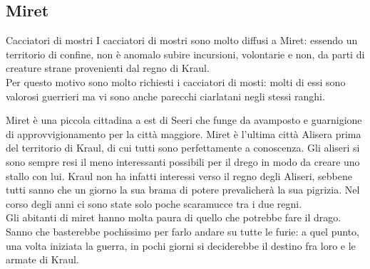 \subsection{Miret}
\begin{commentbox}{Cacciatori di mostri}
  I cacciatori di mostri sono molto diffusi a Miret: essendo un territorio di confine,
  non \`e anomalo subire incursioni, volontarie e non, da parti di creature strane
  provenienti dal regno di Kraul.\\
  Per questo motivo sono molto richiesti i cacciatori di mosti: molti di essi sono valorosi
  guerrieri ma vi sono anche parecchi ciarlatani negli stessi ranghi.
\end{commentbox}
Miret \`e una piccola cittadina a est di Seeri che funge da avamposto e guarnigione di
approvvigionamento per la citt\`a maggiore. Miret \`e l'ultima citt\`a Alisera prima del
territorio di Kraul, di cui tutti sono perfettamente a conoscenza.
Gli aliseri si sono sempre resi il meno interessanti possibili per il drego in modo da
creare uno stallo con lui. Kraul non ha infatti interessi verso il regno degli Aliseri,
sebbene tutti sanno che un giorno la sua brama di potere prevalicher\`a la sua
pigrizia. Nel corso degli anni ci sono state solo poche scaramucce tra i due regni.\\
Gli abitanti di miret hanno molta paura di quello che potrebbe fare il drago.
Sanno che basterebbe pochissimo per farlo andare su tutte le furie: a quel punto,
una volta iniziata la guerra, in pochi giorni si deciderebbe il destino fra loro
e le armate di Kraul.

